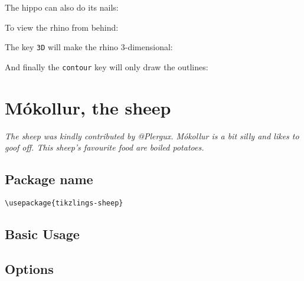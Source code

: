 \documentclass[parskip=half]{scrartcl}
\begin{document}
The hippo can also do its nails:
\begin{tcblisting}{}
\rhino[toes=red]
\end{tcblisting}

To view the rhino from behind:
\begin{tcblisting}{}
\rhino[back]
\end{tcblisting}

The key \lstinline|3D| will make the rhino 3-dimensional:
\begin{tcblisting}{}
\rhino[3D]
\end{tcblisting}

And finally the \lstinline|contour| key will only draw the outlines:
\begin{tcblisting}{}
\rhino[contour=black]
\end{tcblisting}

%
%
\clearpage
\section[Sheep]{Mókollur, the sheep}

\emph{The sheep was kindly contributed by @Plergux. Mókollur is a bit silly and likes to goof off. This sheep's favourite food are boiled potatoes.}

\subsection{Package name}

\begin{tcolorbox}[lower separated=false, lefthand width=.8\linewidth]
\vspace*{0.5cm}
\lstinline|\usepackage{tikzlings-sheep}| 
\vspace*{0.5cm}
\end{tcolorbox}

\subsection{Basic Usage}

\begin{tcblisting}{}
\sheep
\end{tcblisting}

\subsection{Options}
\end{document}
